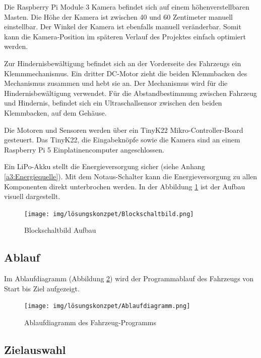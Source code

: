 \documentclass[../main.tex]{subfiles}
\begin{document}
Die Raspberry Pi Module 3 Kamera befindet sich auf einem höhenverstellbaren Masten. Die Höhe der Kamera ist zwischen 40 und 60 Zentimeter manuell einstellbar. Der Winkel der Kamera ist ebenfalls manuell veränderbar. Somit kann die Kamera-Position im späteren Verlauf des Projektes einfach optimiert werden.

Zur Hindernisbewältigung befindet sich an der Vorderseite des Fahrzeugs ein Klemmmechanismus. Ein dritter DC-Motor zieht die beiden Klemmbacken des Mechanismus zusammen und hebt sie an. Der Mechanismus wird für die Hindernisbewältigung verwendet. Für die Abstandbestimmung zwischen Fahrzeug und Hindernis, befindet sich ein Ultraschallsensor zwischen den beiden Klemmbacken, auf dem Gehäuse. 

Die Motoren und Sensoren werden über ein TinyK22 Mikro-Controller-Board gesteuert. Das TinyK22, die Eingabeknöpfe sowie die Kamera sind an einem Raspberry Pi 5 Einplatinencomputer angeschlossen.

Ein LiPo-Akku stellt die Energieversorgung sicher (siehe Anhang \ref{a3:Energiequelle}).
Mit dem Notaus-Schalter kann die Energieversorgung zu allen Komponenten direkt unterbrochen werden.
In der Abbildung \ref{img:Blockschaltbild-Aufbau} ist der Aufbau visuell dargestellt.
\newline
\begin{figure}[H]
\centering
\texttt{[image: img/lösungskonzpet/Blockschaltbild.png]}
\caption{Blockschaltbild Aufbau}
\label{img:Blockschaltbild-Aufbau}
\end{figure}

\subsection{Ablauf}

Im Ablaufdiagramm (Abbildung \ref{img:ablaufdiagramm}) wird der Programmablauf des Fahrzeugs von Start bis Ziel aufgezeigt.

\begin{figure}[H]
\texttt{[image: img/lösungskonzpet/Ablaufdiagramm.png]}
\caption{Ablaufdiagramm des Fahrzeug-Programms}
\label{img:ablaufdiagramm}
\end{figure}

\newpage
\subsection{Zielauswahl}
\end{document}

